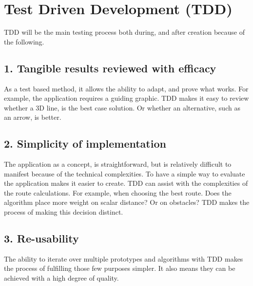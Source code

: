 
\section*{Test Driven Development (TDD)}

TDD will be the main testing process both during, and after creation because of the following. 

\subsection*{1. Tangible results reviewed with efficacy}
As a test based method, it allows the ability to adapt, and prove what works. For example, the application requires a guiding graphic. TDD makes it easy to review whether a 3D line, is the best case solution. Or whether an alternative, such as an arrow, is better.

\subsection*{2. Simplicity of implementation}
The application as a concept, is straightforward, but is relatively difficult to manifest because of the technical complexities. To have a simple way to evaluate the application makes it easier to create. TDD can assist with the complexities of the route calculations. For example, when choosing the best route. Does the algorithm place more weight on scalar distance? Or on obstacles? TDD makes the process of making this decision distinct.

\subsection*{3. Re-usability}
The ability to iterate over multiple prototypes and algorithms with TDD makes the process of fulfilling those few purposes simpler. It also means they can be achieved with a high degree of quality.